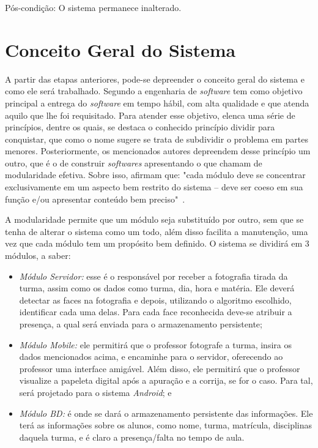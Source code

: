 Pós-condição: O sistema permanece inalterado.




\section{Conceito Geral do Sistema}
\noindent
A partir das etapas anteriores, pode-se depreender o conceito geral do sistema e como ele será trabalhado. Segundo \citep{engenhariasoftware} a engenharia de \textit{software} tem como objetivo principal a entrega do \textit{software} em tempo hábil, com alta qualidade e que atenda aquilo que lhe foi requisitado. Para atender esse objetivo, \citep{engenhariasoftware} elenca uma série de princípios, dentre os quais, se destaca o conhecido princípio dividir para conquistar, que como o nome sugere se trata de subdividir o problema em partes menores. Posteriormente, os mencionados autores depreendem desse princípio um outro, que é o de construir \textit{softwares}  apresentando o que chamam de modularidade efetiva. Sobre isso, afirmam que: "cada módulo deve se concentrar exclusivamente em um aspecto bem restrito do sistema – deve ser coeso em sua função e/ou apresentar conteúdo bem preciso"\ \cite[p. 109]{engenhariasoftware}.

A modularidade permite que um módulo seja substituído por outro, sem que se tenha de alterar o sistema como um todo, além disso facilita a manutenção, uma vez que cada módulo tem um propósito bem definido. O sistema se dividirá em 3 módulos, a saber:

\begin{itemize}
\item \textit{Módulo Servidor:} esse é o responsável por receber a fotografia tirada da turma, assim como os dados como turma, dia, hora e matéria. Ele deverá detectar as faces na fotografia e depois, utilizando o algoritmo escolhido, identificar cada uma delas. Para cada face reconhecida deve-se atribuir a presença, a qual será enviada para o armazenamento persistente;
\item \textit{Módulo Mobile:} ele permitirá que o professor fotografe a turma, insira os dados mencionados acima, e encaminhe para o servidor, oferecendo ao professor uma interface amigável. Além disso, ele permitirá que o professor visualize a papeleta digital após a apuração e a corrija, se for o caso. Para tal, será projetado para o sistema \textit{Android}; e
\item \textit{Módulo BD:} é onde se dará o armazenamento persistente das informações. Ele terá as informações sobre os alunos, como nome, turma, matrícula, disciplinas daquela turma, e é claro a presença/falta no tempo de aula.
\end{itemize}


